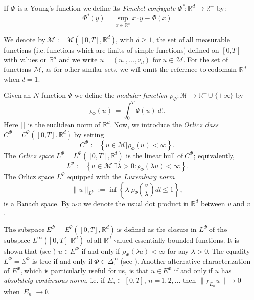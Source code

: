 \documentclass[twoside]{article}
\theoremstyle{remark}
\newcommand{\orlnor}{\|_{L^{\Phi}}}
\newcommand{\lphi}{L^{\Phi}}
\newcommand{\ephi}{E^{\Phi}}
\newcommand{\claseor}{C^{\Phi}}
\renewcommand{\b}[1]{\boldsymbol{#1}}
\newcommand{\rr}{\mathbb{R}}
\renewcommand{\leq}{\leqslant}
\renewcommand{\geq}{\geqslant}
\begin{document}
If $\Phi$ is a Young's function we define its \emph{Fenchel conjugate}   $\Phi^*:\mathbb{R}^d\to \mathbb{R}^+ $ by:
\begin{equation}\label{eq:conjugada}
 \Phi^*(y)=\sup\limits_{x\in\mathbb{R}^d} x\cdot y-\Phi(x)
\end{equation}


 We denote by $\mathcal{M}:=\mathcal{M}([0,T],\rr^d)$, with $d\geq 1$,  the set of all measurable functions (i.e. functions which are limits of simple functions)  defined on $[0,T]$ with values on $\mathbb{R}^d$ and  we write $u=(u_1,\dots,u_d)$ for  $u\in \mathcal{M}$. For the set of functions $\mathcal{M}$, as for other similar sets, we will omit the reference to codomain $\mathbb{R}^d$ when $d=1$.


Given  an $N$-function $\Phi$ we define the \emph{modular function} 
$\rho_{\Phi}:\mathcal{M}\to \mathbb{R}^+\cup\{+\infty\}$ by
\[\rho_{\Phi}(u):= \int_0^T \Phi(u)\ dt.\]
Here $|\cdot|$ is the euclidean norm of $\mathbb{R}^d$.
Now, we introduce the \emph{Orlicz class} $C^{\Phi}=C^{\Phi}([0,T],\rr^d)$   by setting
\begin{equation}\label{claseOrlicz}
  C^{\Phi}:=\left\{u\in \mathcal{M} | \rho_{\Phi}(u)< \infty \right\}.
\end{equation}
The \emph{Orlicz space} $\lphi=L^{\Phi}([0,T],\rr^d)$ is the linear hull of $\claseor$;
equivalently,
\begin{equation}\label{espacioOrlicz}
\lphi:=\left\{ u\in \mathcal{M}| \exists \lambda>0: \rho_{\Phi}(\lambda u) < \infty   \right\}.
\end{equation}
  The Orlicz space $\lphi$ equipped with the \emph{Luxemburg norm}
\[
\|  u  \orlnor:=\inf \left\{ \lambda\bigg| \rho_{\Phi}\left(\frac{v}{\lambda}\right) dt\leq 1\right\},
\]
is a Banach space. By $u\b{\cdot} v$ we denote the usual dot product in $\mathbb{R}^{d}$ between $u$ and $v$.


The subspace $\ephi=\ephi([0,T],\rr^d)$ is defined as the closure in $\lphi$ of the subspace $L^{\infty}([0,T],\rr^d)$ of all $\mathbb{R}^d$-valued essentially bounded functions. It is shown that  (see \cite[Thm. 5.1]{Orliczvectorial2005}) $u\in\ephi$  if and only if $\rho_{\Phi}(\lambda u)<\infty$ for any $\lambda>0$. The equality $\lphi=\ephi$ is true if and only if $\Phi\in\Delta_2^{\infty}$ (see \cite[Thm. 5.2]{Orliczvectorial2005}). Another alternative characterization of $\ephi$, which is particularly useful for us, is that $u\in\ephi$ if and only if $u$ has  \emph{absolutely continuous norm}, i.e.   if $E_n\subset [0,T]$, $n=1,2,\ldots$ then $\|\chi_{E_n}u\|\to 0$ when $|E_n|\to 0$.
\end{document}
